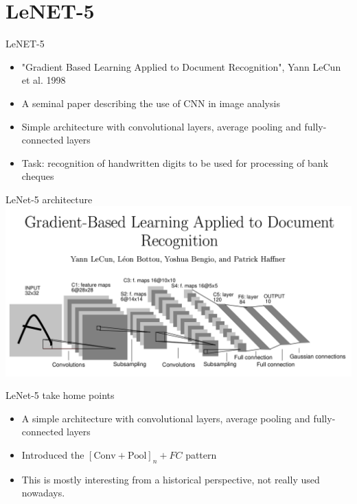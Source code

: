 \documentclass[9pt, aspectratio=169]{beamer}
\begin{document}
\section{LeNET-5}

\begin{frame}
    {LeNET-5}
    \begin{itemize}
        \item "Gradient Based Learning Applied to Document Recognition", Yann LeCun et al. 1998
        \item A seminal paper describing the use of CNN in image analysis
        \item Simple architecture with convolutional layers, average pooling and fully-connected layers
        \item Task: recognition of handwritten digits to be used for processing of bank cheques
    \end{itemize}
\end{frame}

\begin{frame}
    {LeNet-5 architecture}
    \centering
    \includegraphics[width=\textwidth]{LeNet-5.png}
\end{frame}

\begin{frame}
    {LeNet-5 take home points}
    \begin{itemize}
        \item A simple architecture with convolutional layers, average pooling and fully-connected layers
        \item Introduced the $[\text{Conv}+\text{Pool}]_n + FC$ pattern
        \item This is mostly interesting from a historical perspective, not really used nowadays.
    \end{itemize}
\end{frame}
\end{document}
